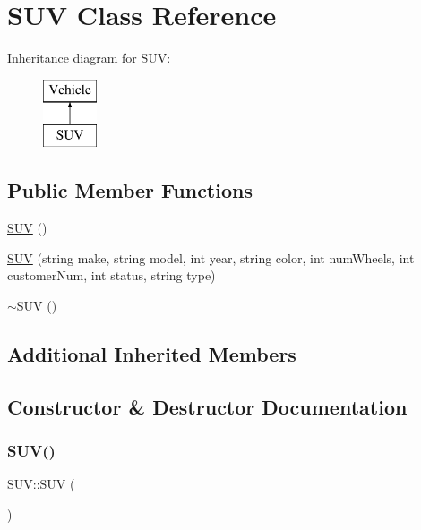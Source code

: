 \hypertarget{class_s_u_v}{}\section{S\+UV Class Reference}
\label{class_s_u_v}
Inheritance diagram for S\+UV\+:\begin{figure}[H]
\begin{center}
\leavevmode
\includegraphics[height=2.000000cm]{class_s_u_v}
\end{center}
\end{figure}
\subsection*{Public Member Functions}
\begin{DoxyCompactItemize}
\item 
\hyperlink{class_s_u_v_a146d74592e3be41fd6e2e7a7d05dac0d}{S\+UV} ()
\item 
\hyperlink{class_s_u_v_a221a9726b31f7e69f4e746624d0ea50e}{S\+UV} (string make, string model, int year, string color, int num\+Wheels, int customer\+Num, int status, string type)
\item 
\hyperlink{class_s_u_v_abcf2fe9b86e78678fd634598f4b3c738}{$\sim$\+S\+UV} ()
\end{DoxyCompactItemize}
\subsection*{Additional Inherited Members}


\subsection{Constructor \& Destructor Documentation}
\mbox{\label{class_s_u_v_a146d74592e3be41fd6e2e7a7d05dac0d}} 
\subsubsection{\texorpdfstring{S\+U\+V()}{SUV()}\hspace{0.1cm}{\footnotesize\ttfamily [1/2]}}
{\footnotesize\ttfamily S\+U\+V\+::\+S\+UV (\begin{DoxyParamCaption}{ }\end{DoxyParamCaption})}

